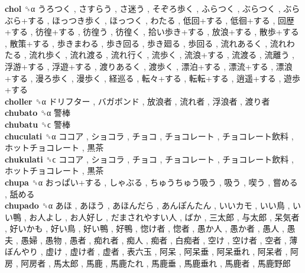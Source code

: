 \textbf{chol} ␝α   うろつく ,  さすらう ,  さ迷う ,  そぞろ歩く ,  ふらつく ,  ぶらつく ,  ぶらぶら+する ,  ほっつき歩く ,  ほっつく ,  わたる ,  低回+する ,  低徊+する ,  回歴+する ,  彷徨+する ,  彷徨う ,  彷徨く ,  拾い歩き+する ,  放浪+する ,  散歩+する ,  散策+する ,  歩きまわる ,  歩き回る ,  歩き廻る ,  歩回る ,  流れあるく ,  流れわたる ,  流れ歩く ,  流れ渡る ,  流れ行く ,  流歩く ,  流浪+する ,  流渡る ,  流離う ,  浮游+する ,  浮遊+する ,  渡りあるく ,  渡歩く ,  漂泊+する ,  漂流+する ,  漂浪+する ,  漫ろ歩く ,  漫歩く ,  経巡る ,  転々+する ,  転転+する ,  逍遥+する ,  遊歩+する   \\
\textbf{choller} ␝α   ドリフター ,  バガボンド ,  放浪者 ,  流れ者 ,  浮浪者 ,  渡り者   \\
\textbf{chubato} ␝α   警棒   \\
\textbf{chubatu} ␝ϲ   警棒   \\
\textbf{chuculati} ␝α   ココア ,  ショコラ ,  チョコ ,  チョコレート ,  チョコレート飲料 ,  ホットチョコレート ,  黒茶   \\
\textbf{chukulati} ␝ϲ   ココア ,  ショコラ ,  チョコ ,  チョコレート ,  チョコレート飲料 ,  ホットチョコレート ,  黒茶   \\
\textbf{chupa} ␝α   おっぱい+する ,  しゃぶる ,  ちゅうちゅう吸う ,  吸う ,  喫う ,  嘗める ,  舐める   \\
\textbf{chupado} ␝α   あほ ,  あほう ,  あほんだら ,  あんぽんたん ,  いいカモ ,  いい鳥 ,  いい鴨 ,  お人よし ,  お人好し ,  だまされやすい人 ,  ばか ,  三太郎 ,  与太郎 ,  呆気者 ,  好いかも ,  好い鳥 ,  好い鴨 ,  好鴨 ,  惚け者 ,  惚者 ,  愚か人 ,  愚か者 ,  愚人 ,  愚夫 ,  愚婦 ,  愚物 ,  愚者 ,  痴れ者 ,  痴人 ,  痴者 ,  白痴者 ,  空け ,  空け者 ,  空者 ,  薄ぼんやり ,  虚け ,  虚け者 ,  虚者 ,  表六玉 ,  阿呆 ,  阿呆垂 ,  阿呆垂れ ,  阿呆者 ,  阿房 ,  阿房者 ,  馬太郎 ,  馬鹿 ,  馬鹿たれ ,  馬鹿垂 ,  馬鹿垂れ ,  馬鹿者 ,  馬鹿野郎   \\

